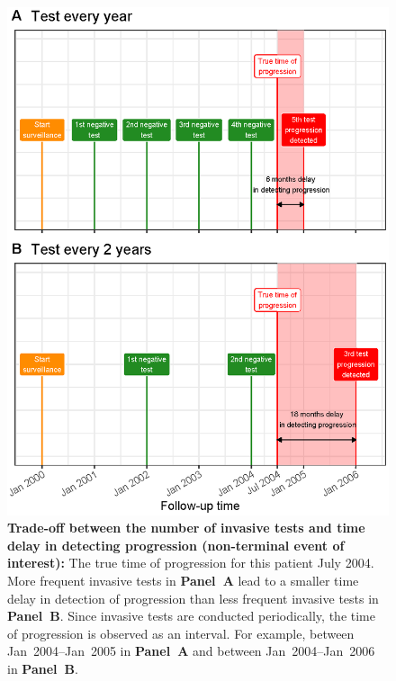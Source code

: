 \begin{figure}
\centerline{\includegraphics{images/delay_explanation.eps}}
\caption{\textbf{Trade-off between the number of invasive tests and time delay in detecting progression (non-terminal event of interest):} The true time of progression for this patient July 2004. More frequent invasive tests in \textbf{Panel~A} lead to a smaller time delay in detection of progression than less frequent invasive tests in \textbf{Panel~B}. Since invasive tests are conducted periodically, the time of progression is observed as an interval. For example, between Jan~2004--Jan~2005 in \textbf{Panel~A} and between Jan~2004--Jan~2006 in \textbf{Panel~B}.} 
\label{fig:delay_explanation}
\end{figure}

